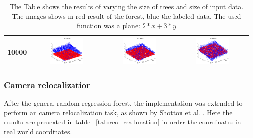 \begin{landscape}
\begin{table}[p]
\begin{tabular}{|c|c|c|c|}
10000& \includegraphics[width=0.5\textwidth, height=0.35\textheight]{fig/plane_10k_50} & \includegraphics[width=0.5\textwidth, height=0.35\textheight]{fig/plane_10k_150} & \includegraphics[width=0.5\textwidth, height=0.35\textheight]{fig/plane_10k_1500} \\ \hline
\bottomrule
\end{tabular}
\caption{The Table shows the results of varying the size of trees and size of input data. The images shows in red result of the forest, blue the labeled data. The used function was a plane: $2*x + 3*y$}
\label{tab:res_gen_plane}
\end{table}

\end{landscape}

\subsubsection*{Camera relocalization} %
\label{ssub:relocalization}
After the general random regression forest, the implementation was extended to perform an camera relocalization task, as shown by Shotton et al. \cite{shotton}. Here the results are presented in table ~\ref{tab:res_reallocation} in order the coordinates in real world coordinates.

